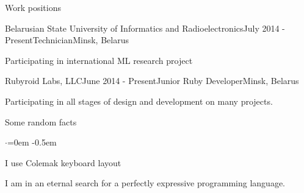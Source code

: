 \documentclass{resume} %
\begin{document}

\begin{rSection}{Work positions}

\begin{rSubsection}{Belarusian State University of Informatics and Radioelectronics}{July 2014 - Present}{Technician}{Minsk, Belarus}
\item Participating in international ML research project
\end{rSubsection}

\begin{rSubsection}{Rubyroid Labs, LLC}{June 2014 - Present}{Junior Ruby Developer}{Minsk, Belarus}
\item Participating in all stages of design and development on many projects.
\end{rSubsection}

\end{rSection}


\begin{rSection}{Some random facts}
  \smallskip
  \begin{list}{$\cdot$}{\leftmargin=0em} %
    \itemsep -0.5em \vspace{-0.3em} %
  \item I use Colemak keyboard layout
  \item I am in an eternal search for a perfectly expressive programming language.
  \end{list}
\end{rSection}


\end{document}
